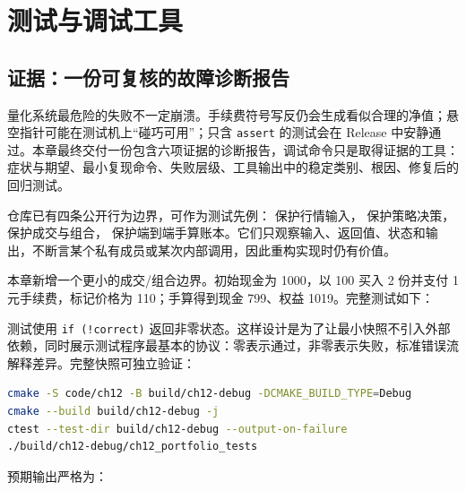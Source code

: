 \chapter{测试与调试工具}


\section{证据：一份可复核的故障诊断报告}

量化系统最危险的失败不一定崩溃。手续费符号写反仍会生成看似合理的净值；悬空指针可能在测试机上“碰巧可用”；只含 \texttt{assert} 的测试会在 Release 中安静通过。本章最终交付一份包含六项证据的诊断报告，调试命令只是取得证据的工具：症状与期望、最小复现命令、失败层级、工具输出中的稳定类别、根因、修复后的回归测试。

仓库已有四条公开行为边界，可作为测试先例： 保护行情输入， 保护策略决策， 保护成交与组合， 保护端到端手算账本。它们只观察输入、返回值、状态和输出，不断言某个私有成员或某次内部调用，因此重构实现时仍有价值。

本章新增一个更小的成交/组合边界。初始现金为 1000，以 100 买入 2 份并支付 1 元手续费，标记价格为 110；手算得到现金 799、权益 1019。完整测试如下：



测试使用 \texttt{if (!correct)} 返回非零状态。这样设计是为了让最小快照不引入外部依赖，同时展示测试程序最基本的协议：零表示通过，非零表示失败，标准错误流解释差异。完整快照可独立验证：

\begin{lstlisting}[language=bash,numbers=none]
cmake -S code/ch12 -B build/ch12-debug -DCMAKE_BUILD_TYPE=Debug
cmake --build build/ch12-debug -j
ctest --test-dir build/ch12-debug --output-on-failure
./build/ch12-debug/ch12_portfolio_tests
\end{lstlisting}

预期输出严格为：


